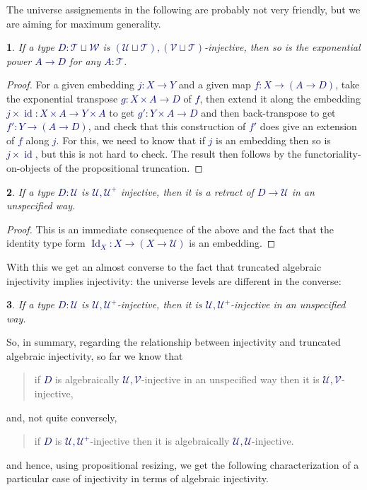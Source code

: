 \documentclass[10pt]{article}
\newcommand{\db}{\textcolor{darkblue}}
\newcommand{\m}[1]{\db{$#1$}}
\newcommand{\id}{\operatorname{id}}
\newcommand{\U}{\mathcal{U}}
\newcommand{\V}{\mathcal{V}}
\newcommand{\W}{\mathcal{W}}
\newcommand{\T}{\mathcal{T}}
\newcommand{\Id}{\operatorname{Id}}
\newtheorem{numbered}{}
\theoremstyle{definition}
\begin{document}
The universe assignements in the following are probably not very
friendly, but we are aiming for maximum generality.
\begin{numbered}
 If a type \m{D : \T \sqcup \W} is \m{(\U \sqcup \T),(\V \sqcup \T)}-injective, then so is the exponential power \m{A \to D} for any \m{A:\T}.
\end{numbered}
\begin{proof}
  For a given embedding \m{j : X \to Y} and a given map \m{f : X \to
    (A \to D)}, take the exponential transpose \m{g : X \times A \to
    D} of \m{f}, then extend it along the embedding \m{j \times \id :
    X \times A \to Y \times A} to get \m{g' : Y \times A \to D} and
  then back-transpose to get \m{f' : Y \to (A \to D)}, and check that
  this construction of \m{f'} does give an extension of \m{f} along
  \m{j}. For this, we need to know that if \m{j} is an embedding then
  so is \m{j \times \id}, but this is not hard to check. The result
  then follows by the functoriality-on-objects of the propositional
  truncation.
\end{proof}


\begin{numbered}
  If a type \m{D:\U} is \m{\U,\U^+} injective, then it is a retract of
  \m{D \to \U} in an unspecified way.
\end{numbered}
\begin{proof}
  This is an immediate consequence of the above and the fact that the
  identity type form \m{\Id_X : X \to (X \to \U)} is an embedding.
\end{proof}

With this we get an almost converse to the fact that truncated
algebraic injectivity implies injectivity: the universe levels are
different in the converse:

\begin{numbered}
  If a type \m{D:\U} is \m{\U,\U^+}-injective, then it is \m{\U,\U^+}-injective in an unspecified way.
\end{numbered}

So, in summary, regarding the relationship between injectivity and
truncated algebraic injectivity, so far we know that
\begin{quote}
  if \m{D} is algebraically \m{\U,\V}-injective in an unspecified way
  then it is \m{\U,\V}-injective,
\end{quote}
and, not quite conversely,
\begin{quote}
  if \m{D} is \m{\U,\U^+}-injective then it is algebraically \m{\U,\U}-injective.
\end{quote}
and hence, using propositional resizing, we get the following
characterization of a particular case of injectivity in terms of
algebraic injectivity.
\end{document}

